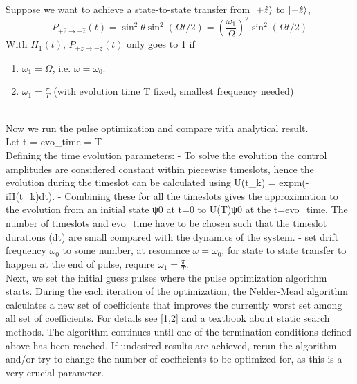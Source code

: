 \documentclass[12pt]{article}
\begin{document}
Suppose we want to achieve a state-to-state transfer from $\ket{+\hat{z}}$ to $\ket{-\hat{z}}$,  
$$
P_{+\hat{z} \rightarrow-\hat{z}}(t) = \sin ^2 \theta \sin ^2(\Omega t / 2)=\left(\frac{\omega_1}{\Omega}\right)^2 \sin ^2(\Omega t / 2)
$$
With $H_1(t)$, $P_{+\hat{z} \rightarrow-\hat{z}}(t)$ only goes to 1 if 
\begin{enumerate}
    \item $\omega_1 = \Omega$, i.e. $\omega = \omega_0$.
    \item $\omega_1 = \frac{\pi}{T}$ (with evolution time T fixed, smallest frequency needed)
\end{enumerate}
\\
Now we run the pulse optimization and compare with analytical result. 
\\
Let t = evo\_time = T
\\
Defining the time evolution parameters:
- To solve the evolution the control amplitudes are considered constant within piecewise timeslots, hence the evolution during the timeslot can be calculated using U(t\_k) = expm(-iH(t\_k)dt). 
- Combining these for all the timeslots gives the approximation to the evolution from an initial state ψ0 at t=0 to U(T)ψ0 at the t=evo\_time. The number of timeslots and evo\_time have to be chosen such that the timeslot durations (dt) are small compared with the dynamics of the system.
- set drift frequency $\omega_0$ to some number, at resonance $\omega = \omega_0$, for state to state transfer to happen at the end of pulse, require $\omega_1 = \frac{\pi}{T}$.
\\
Next, we set the initial guess pulses where the pulse optimization algorithm starts. 
During the each iteration of the optimization, the Nelder-Mead algorithm calculates a new set of coefficients that improves the currently worst set among all set of coefficients. For details see [1,2] and a textbook about static search methods. 
The algorithm continues until one of the termination conditions defined above has been reached. If undesired results are achieved, rerun the algorithm and/or try to change the number of coefficients to be optimized for, as this is a very crucial parameter.  
\end{document}
